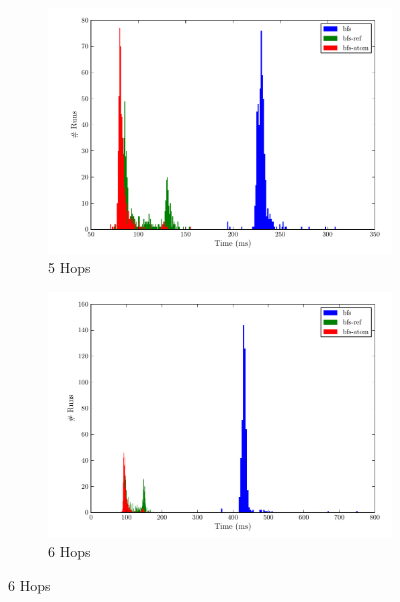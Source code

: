				\begin{figure}
					\ContinuedFloat
					\begin{subfigure}[b]{.5\linewidth}
						\includegraphics[scale=0.45]{figures/charts/5_hops.pdf}
						\caption{5 Hops}
						\label{subfig:5-hops}
					\end{subfigure}
					\begin{subfigure}[b]{.5\linewidth}
						\includegraphics[scale=0.45]{figures/charts/6_hops.pdf}
						\caption{6 Hops}
						\label{subfig:6-hops}
					\end{subfigure}
				\end{figure}
